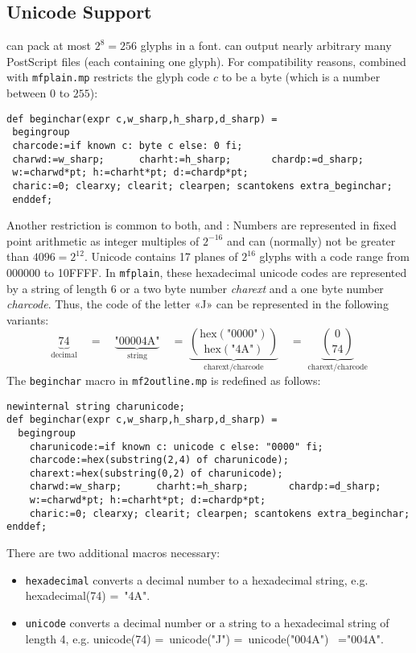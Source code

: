 \documentclass{scrartcl}
\begin{document}
\subsection{Unicode Support}
%
\MF{} can pack at most $2^{8}=256$ glyphs in a font. \MP{} can output nearly arbitrary many PostScript files (each containing one glyph). For compatibility reasons, \MP{} combined with \texttt{mfplain.mp} restricts the glyph code $c$ to be a byte (which is a number between $0$ to $255$):
\lstset{language=MetaPost,columns=fullflexible}
\begin{lstlisting}
def beginchar(expr c,w_sharp,h_sharp,d_sharp) =
 begingroup
 charcode:=if known c: byte c else: 0 fi;
 charwd:=w_sharp;      charht:=h_sharp;       chardp:=d_sharp;
 w:=charwd*pt; h:=charht*pt; d:=chardp*pt;
 charic:=0; clearxy; clearit; clearpen; scantokens extra_beginchar;
 enddef;
\end{lstlisting}
%
Another restriction is common to both, \MF{} and \MP: Numbers are represented in fixed point arithmetic as integer multiples of $2^{-16}$ and can (normally) not be greater than $4096=2^{12}$. Unicode contains 17 planes of $2^{16}$ glyphs with a code range from 000000 to 10FFFF. In \texttt{mfplain}, these hexadecimal unicode codes are represented by a string of length $6$ or a two byte number \emph{charext} and a one byte number \emph{charcode}. Thus, the code of the letter «J» can be represented in the following variants:
\[
	\underbrace{74}_{\text{decimal}}\quad=\quad\underbrace{\text{"00004A"}}_{\text{string}}\quad=\;\underbrace{\binom{\mathrm{hex}(\text{"0000"})}{\mathrm{hex}(\text{"4A"})}}_{\text{charext/charcode}}\quad=\;\underbrace{\binom{0}{74}}_{\text{charext/charcode}}
\]
The \texttt{beginchar} macro in \texttt{mf2outline.mp} is redefined as follows:
\lstset{language=MetaPost,columns=fullflexible}
\begin{lstlisting}
newinternal string charunicode;
def beginchar(expr c,w_sharp,h_sharp,d_sharp) =
  begingroup
    charunicode:=if known c: unicode c else: "0000" fi; 
    charcode:=hex(substring(2,4) of charunicode); 
    charext:=hex(substring(0,2) of charunicode); 
    charwd:=w_sharp;      charht:=h_sharp;       chardp:=d_sharp;
    w:=charwd*pt; h:=charht*pt; d:=chardp*pt;
    charic:=0; clearxy; clearit; clearpen; scantokens extra_beginchar;
enddef;
\end{lstlisting}
%
There are two additional macros necessary:
\begin{itemize}
	\item \texttt{hexadecimal} converts a decimal number to a hexadecimal string, e.g. hexadecimal(74) =~"4A".
	\item \texttt{unicode} converts a decimal number or a string to a hexadecimal string of length 4, e.g. unicode(74) =~unicode("J") =~unicode("004A") ~="004A".
\end{itemize}
\end{document}
